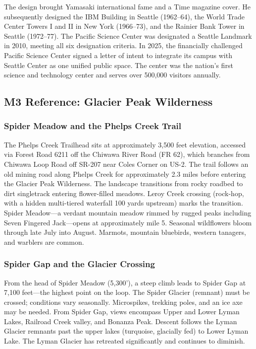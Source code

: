 \documentclass[11pt,letterpaper]{article}
\begin{document}
The design brought Yamasaki international fame and a Time magazine cover. He subsequently designed the IBM Building in Seattle (1962--64), the World Trade Center Towers I and II in New York (1966--73), and the Rainier Bank Tower in Seattle (1972--77). The Pacific Science Center was designated a Seattle Landmark in 2010, meeting all six designation criteria. In 2025, the financially challenged Pacific Science Center signed a letter of intent to integrate its campus with Seattle Center as one unified public space. The center was the nation's first science and technology center and serves over 500,000 visitors annually.

\subsection{M3 Reference: Glacier Peak Wilderness}

\subsubsection{Spider Meadow and the Phelps Creek Trail}
The Phelps Creek Trailhead sits at approximately 3,500 feet elevation, accessed via Forest Road 6211 off the Chiwawa River Road (FR 62), which branches from Chiwawa Loop Road off SR-207 near Coles Corner on US-2. The trail follows an old mining road along Phelps Creek for approximately 2.3 miles before entering the Glacier Peak Wilderness. The landscape transitions from rocky roadbed to dirt singletrack entering flower-filled meadows. Leroy Creek crossing (rock-hop, with a hidden multi-tiered waterfall 100 yards upstream) marks the transition. Spider Meadow---a verdant mountain meadow rimmed by rugged peaks including Seven Fingered Jack---opens at approximately mile 5. Seasonal wildflowers bloom through late July into August. Marmots, mountain bluebirds, western tanagers, and warblers are common.

\subsubsection{Spider Gap and the Glacier Crossing}
From the head of Spider Meadow (5,300'), a steep climb leads to Spider Gap at 7,100 feet---the highest point on the loop. The Spider Glacier (remnant) must be crossed; conditions vary seasonally. Microspikes, trekking poles, and an ice axe may be needed. From Spider Gap, views encompass Upper and Lower Lyman Lakes, Railroad Creek valley, and Bonanza Peak. Descent follows the Lyman Glacier remnants past the upper lakes (turquoise, glacially fed) to Lower Lyman Lake. The Lyman Glacier has retreated significantly and continues to diminish.
\end{document}
